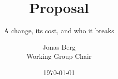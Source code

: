 \documentclass[aspectratio=169,11pt]{beamer}
\title{Proposal}
\subtitle{A change, its cost, and who it breaks}
\author{Jonas Berg \\ \small Working Group Chair}
\date{\today}
\begin{document}
\titleslide





\end{document}
